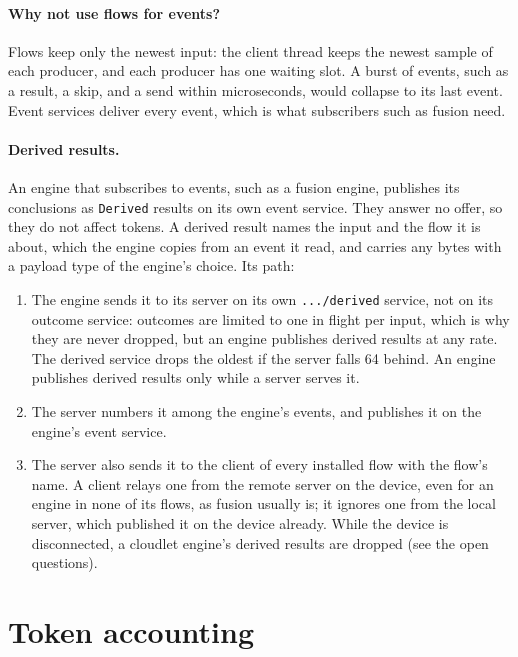 \documentclass[11pt]{article}
\newcommand{\code}[1]{\texttt{#1}}
\begin{document}
\paragraph{Why not use flows for events?} Flows keep only the newest input:
the client thread keeps the newest sample of each producer, and each
producer has one waiting slot. A burst of events, such as a result, a skip, and
a send within microseconds, would collapse to its last event. Event services
deliver every event, which is what subscribers such as fusion need.

\paragraph{Derived results.} An engine that subscribes to events, such as a
fusion engine, publishes its conclusions as \code{Derived} results on its own
event service. They answer no offer, so they do not affect tokens. A derived
result names the input and the flow it is about, which the engine copies from
an event it read, and carries any bytes with a payload type of the engine's
choice. Its path:
\begin{enumerate}[nosep]
  \item The engine sends it to its server on its own \code{.../derived}
        service, not on its outcome service: outcomes are limited to one in
        flight per input, which is why they are never dropped, but an engine
        publishes derived results at any rate. The derived service drops the
        oldest if the server falls 64 behind. An engine publishes derived
        results only while a server serves it.
  \item The server numbers it among the engine's events, and publishes it on
        the engine's event service.
  \item The server also sends it to the client of every installed flow with
        the flow's name. A client relays one from the remote server on the
        device, even for an engine in none of its flows, as fusion usually is;
        it ignores one from the local server, which published it on the device
        already. While the device is disconnected, a cloudlet engine's derived
        results are dropped (see the open questions).
\end{enumerate}

\section{Token accounting}
\label{sec:accounting}
\end{document}
